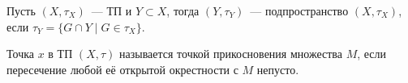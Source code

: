 \vspace{1cm}
\begin{definition}[Подпространство в ТП]
  Пусть $(X,\tau_X)$~--- ТП и $Y \subset X$, тогда $(Y, \tau_Y)$~--- подпространство $(X, \tau_X)$, если $\tau_Y = \{G \cap Y \mid G \in \tau_X \}$.
\end{definition}

\begin{definition}
  Точка $x$ в ТП $(X, \tau)$ называется точкой прикосновения множества $M$, если пересечение любой её открытой окрестности с $M$ непусто.
\end{definition}
